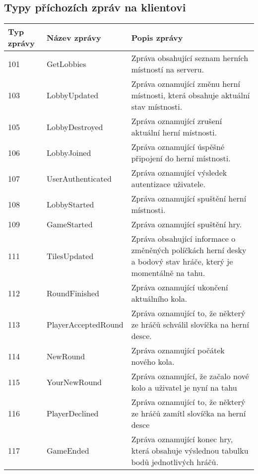 \documentclass[12pt, a4paper]{article}
\begin{document}
   	    \subsection{Typy příchozích zpráv na klientovi}
\begin{center}
		\begin{tabularx}{\textwidth}{|l|l|X|}
			\hline
			\textbf{Typ zprávy} & \textbf{Název zprávy} & \textbf{Popis zprávy} \\ 
			\hline
			101          &GetLobbies              &Zpráva obsahující seznam herních místností na serveru.\\
			\hline
			103          &LobbyUpdated         &Zpráva oznamující změnu herní místnosti, která obsahuje aktuální stav místnosti.\\
			\hline
			105          &LobbyDestroyed&Zpráva oznamující zrušení aktuální herní místnosti.\\
			\hline
			106          &LobbyJoined        &Zpráva oznamující úspěšné připojení do herní místnosti.\\
			\hline
			107          &UserAuthenticated            &Zpráva oznamující výsledek autentizace uživatele.\\
			\hline
			108          &LobbyStarted       &Zpráva oznamující spuštění herní místnosti.\\
			\hline
			109          &GameStarted              &Zpráva oznamující spuštění hry.\\
			\hline
			111          &TilesUpdated              &Zpráva obsahující informace o změněných políčkách herní desky a bodový stav hráče, který je momentálně na tahu.\\
			\hline
			112          &RoundFinished              &Zpráva oznamující ukončení aktuálního kola.\\
			\hline
			113          &PlayerAcceptedRound             &Zpráva oznamující to, že některý ze hráčů schválil slovíčka na herní desce.\\
			\hline
			114          &NewRound           &Zpráva oznamující počátek nového kola.\\
			\hline
			115          &YourNewRound&Zpráva oznamující, že začalo nové kolo a uživatel je nyní na tahu\\
			\hline
			116          &PlayerDeclined           &Zpráva oznamující to, že některý ze hráčů zamítl slovíčka na herní desce\\
			\hline
			117          &GameEnded&Zpráva oznamující konec hry, která obsahuje výslednou tabulku bodů jednotlivých hráčů.\\
			\hline
		\end{tabularx}
\end{center}  
\end{document}
